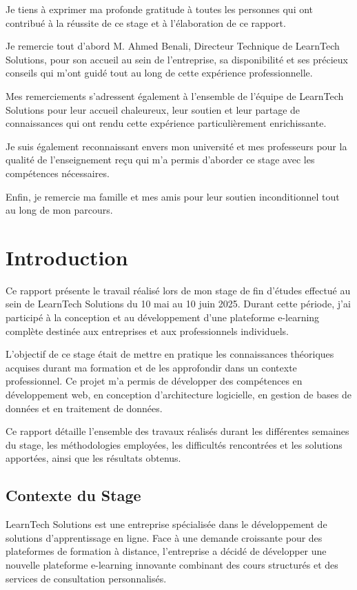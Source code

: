 \documentclass[12pt, a4paper]{report}
\begin{document}
Je tiens à exprimer ma profonde gratitude à toutes les personnes qui ont contribué à la réussite de ce stage et à l'élaboration de ce rapport.

Je remercie tout d'abord M. Ahmed Benali, Directeur Technique de LearnTech Solutions, pour son accueil au sein de l'entreprise, sa disponibilité et ses précieux conseils qui m'ont guidé tout au long de cette expérience professionnelle.

Mes remerciements s'adressent également à l'ensemble de l'équipe de LearnTech Solutions pour leur accueil chaleureux, leur soutien et leur partage de connaissances qui ont rendu cette expérience particulièrement enrichissante.

Je suis également reconnaissant envers mon université et mes professeurs pour la qualité de l'enseignement reçu qui m'a permis d'aborder ce stage avec les compétences nécessaires.

Enfin, je remercie ma famille et mes amis pour leur soutien inconditionnel tout au long de mon parcours.

\newpage

\tableofcontents
\thispagestyle{fancy}
\newpage

\chapter{Introduction}
\thispagestyle{fancy}

Ce rapport présente le travail réalisé lors de mon stage de fin d'études effectué au sein de LearnTech Solutions du 10 mai au 10 juin 2025. Durant cette période, j'ai participé à la conception et au développement d'une plateforme e-learning complète destinée aux entreprises et aux professionnels individuels.

L'objectif de ce stage était de mettre en pratique les connaissances théoriques acquises durant ma formation et de les approfondir dans un contexte professionnel. Ce projet m'a permis de développer des compétences en développement web, en conception d'architecture logicielle, en gestion de bases de données et en traitement de données.

Ce rapport détaille l'ensemble des travaux réalisés durant les différentes semaines du stage, les méthodologies employées, les difficultés rencontrées et les solutions apportées, ainsi que les résultats obtenus.

\section{Contexte du Stage}
LearnTech Solutions est une entreprise spécialisée dans le développement de solutions d'apprentissage en ligne. Face à une demande croissante pour des plateformes de formation à distance, l'entreprise a décidé de développer une nouvelle plateforme e-learning innovante combinant des cours structurés et des services de consultation personnalisés.
\end{document}
